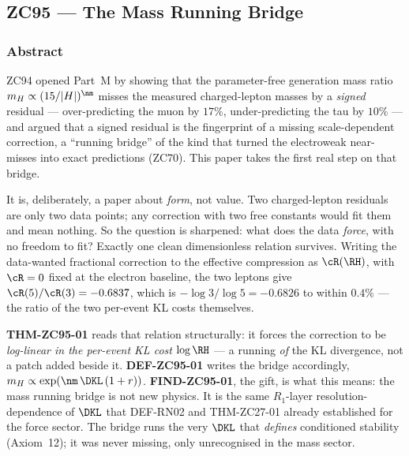 \documentclass[12pt, a4paper]{article}
\begin{document}


\subsection{ZC95 --- The Mass Running Bridge}
\subsubsection*{Abstract}
\sloppy
ZC94 opened Part~M by showing that the parameter-free generation mass ratio
$m_H\propto(15/|H|)^{\nm}$ misses the measured charged-lepton masses by a
\emph{signed} residual --- over-predicting the muon by $17\%$, under-predicting
the tau by $10\%$ --- and argued that a signed residual is the fingerprint of a
missing scale-dependent correction, a ``running bridge'' of the kind that
turned the electroweak near-misses into exact predictions (ZC70). This paper
takes the first real step on that bridge.

It is, deliberately, a paper about \emph{form}, not value. Two charged-lepton
residuals are only two data points; any correction with two free constants
would fit them and mean nothing. So the question is sharpened: what does the
data \emph{force}, with no freedom to fit? Exactly one clean dimensionless
relation survives. Writing the data-wanted fractional correction to the
effective compression as $\cR(\RH)$, with $\cR=0$ fixed at the electron
baseline, the two leptons give $\cR(5)/\cR(3)=-0.6837$, which is
$-\log 3/\log 5=-0.6826$ to within $0.4\%$ --- the ratio of the two per-event
KL costs themselves.

\textbf{THM-ZC95-01} reads that relation structurally: it forces the correction
to be \emph{log-linear in the per-event KL cost} $\log\RH$ --- a running
\emph{of} the KL divergence, not a patch added beside it. \textbf{DEF-ZC95-01}
writes the bridge accordingly, $m_H\propto\exp(\nm\,\DKL\,(1+r))$.
\textbf{FIND-ZC95-01}, the gift, is what this means: the mass running bridge is
not new physics. It is the same $R_1$-layer resolution-dependence of $\DKL$ that
DEF-RN02 and THM-ZC27-01 already established for the force sector. The bridge
runs the very $\DKL$ that \emph{defines} conditioned stability (Axiom~12); it
was never missing, only unrecognised in the mass sector.
\end{document}
